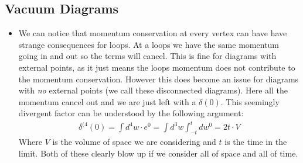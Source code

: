 \documentclass[11pt]{article}
\numberwithin{equation}{section}
\begin{document}
\subsection{Vacuum Diagrams} %
\label{sub:vacuum_diagrams}
\begin{itemize}
  \item We can notice that momentum conservation at every vertex can have have strange consequences for loops. At a loops we have the same momentum going in and out so the terms will cancel. This is fine for diagrams with external points, as it just means the loops momentum does not contribute to the momentum conservation. However this does become an issue for diagrams with \emph{no} external points (we call these disconnected diagrams). Here all the momentum cancel out and we are just left with a $\delta(0)$. This seemingly divergent factor can be understood by the following argument:
  \begin{align*}
    \delta^{(4}(0) = \int d^4w \cdot e^{0} = \int d^3w\int_{-t}^{t} dw^{0} = 2t\cdot V  
  \end{align*}
  Where $V$ is the volume of space we are considering and $t$ is the time in the limit. Both of these clearly blow up if we consider all of space and all of time. 


\end{itemize}
\end{document}
